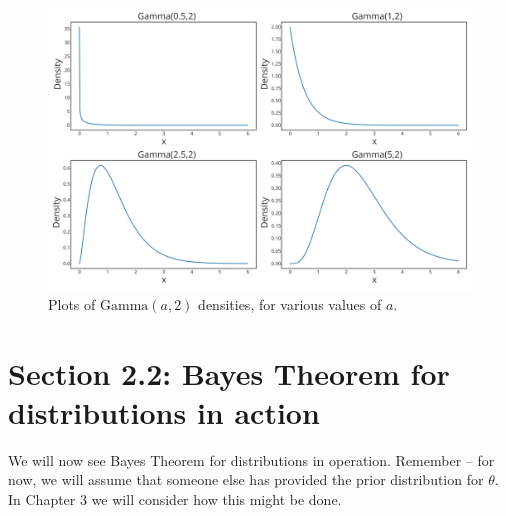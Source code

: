 \begin{figure}[!h]
\centering
\includegraphics{images/gammaplot1.svg}
\caption{Plots of $\mathrm{Gamma}(a,2)$ densities, for various values of $a$.}
\end{figure}

\clearpage

\section{Section 2.2: Bayes Theorem for distributions in action}
\noindent We will now see Bayes Theorem for distributions in operation.  Remember -- for now, we will assume that someone else has provided the prior distribution for $\theta$. In Chapter 3 we will consider how this might be done.  

